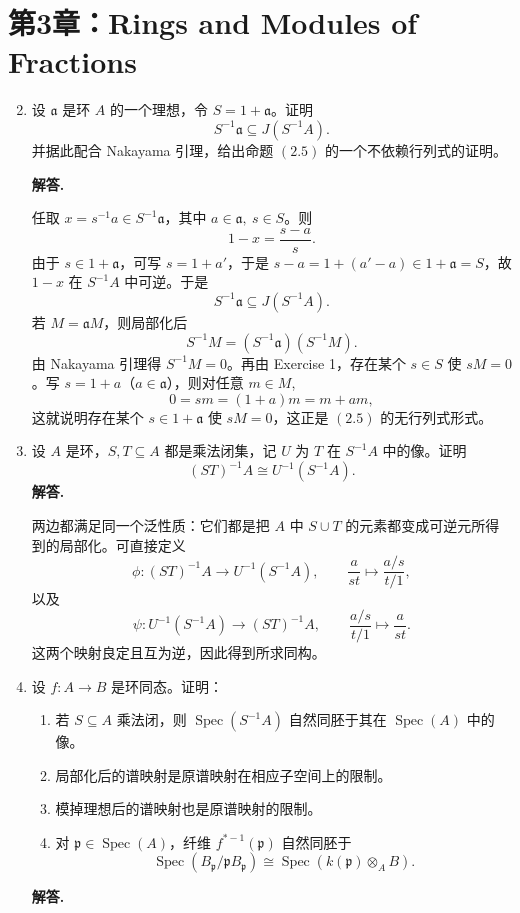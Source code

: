 \documentclass[a4paper]{ctexart}
\begin{document}
\section{第3章：Rings and Modules of Fractions}

\begin{enumerate}[leftmargin=*, label=\textbf{3.\arabic*.}]
\setcounter{enumi}{1}
\item 设 \(\mathfrak a\) 是环 \(A\) 的一个理想，令 \(S=1+\mathfrak a\)。证明
\[
S^{-1}\mathfrak a \subseteq J(S^{-1}A).
\]
并据此配合 Nakayama 引理，给出命题 \((2.5)\) 的一个不依赖行列式的证明。

\textbf{解答.}

任取 \(x=s^{-1}a\in S^{-1}\mathfrak a\)，其中 \(a\in\mathfrak a,\ s\in S\)。则
\[
1-x=\frac{s-a}{s}.
\]
由于 \(s\in 1+\mathfrak a\)，可写 \(s=1+a'\)，于是 \(s-a=1+(a'-a)\in 1+\mathfrak a=S\)，故 \(1-x\) 在 \(S^{-1}A\) 中可逆。于是
\[
S^{-1}\mathfrak a \subseteq J(S^{-1}A).
\]
若 \(M=\mathfrak aM\)，则局部化后
\[
S^{-1}M=(S^{-1}\mathfrak a)(S^{-1}M).
\]
由 Nakayama 引理得 \(S^{-1}M=0\)。再由 Exercise 1，存在某个 \(s\in S\) 使 \(sM=0\)。写 \(s=1+a\)（\(a\in\mathfrak a\)），则对任意 \(m\in M\),
\[
0=sm=(1+a)m=m+am,
\]
这就说明存在某个 \(s\in 1+\mathfrak a\) 使 \(sM=0\)，这正是 \((2.5)\) 的无行列式形式。

\item 设 \(A\) 是环，\(S,T\subseteq A\) 都是乘法闭集，记 \(U\) 为 \(T\) 在 \(S^{-1}A\) 中的像。证明
\[
(ST)^{-1}A \cong U^{-1}(S^{-1}A).
\]
\textbf{解答.}

两边都满足同一个泛性质：它们都是把 \(A\) 中 \(S\cup T\) 的元素都变成可逆元所得到的局部化。可直接定义
\[
\phi:(ST)^{-1}A\to U^{-1}(S^{-1}A),\qquad \frac{a}{st}\mapsto \frac{a/s}{t/1},
\]
以及
\[
\psi:U^{-1}(S^{-1}A)\to (ST)^{-1}A,\qquad \frac{a/s}{t/1}\mapsto \frac{a}{st}.
\]
这两个映射良定且互为逆，因此得到所求同构。

\setcounter{enumi}{14}
\item 设 \(f:A\to B\) 是环同态。证明：
\begin{enumerate}[label=(\roman*)]
\item 若 \(S\subseteq A\) 乘法闭，则 \(\operatorname{Spec}(S^{-1}A)\) 自然同胚于其在 \(\operatorname{Spec}(A)\) 中的像。
\item 局部化后的谱映射是原谱映射在相应子空间上的限制。
\item 模掉理想后的谱映射也是原谱映射的限制。
\item 对 \(\mathfrak p\in\operatorname{Spec}(A)\)，纤维 \(f^{*-1}(\mathfrak p)\) 自然同胚于
\[
\operatorname{Spec}(B_{\mathfrak p}/\mathfrak p B_{\mathfrak p})
\cong
\operatorname{Spec}(k(\mathfrak p)\otimes_A B).
\]
\end{enumerate}
\textbf{解答.}


\end{enumerate}
\end{document}
